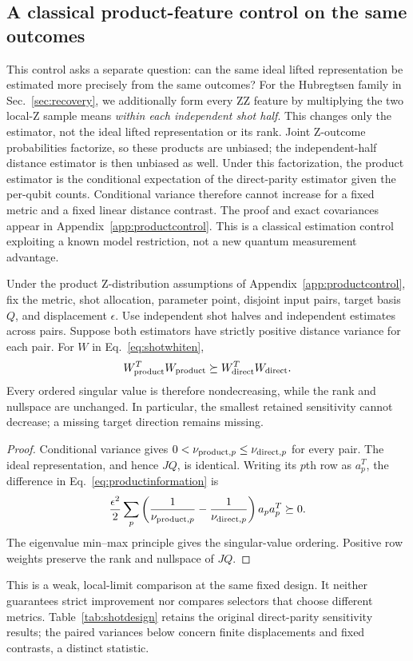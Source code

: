 \subsection{A classical product-feature control on the same outcomes}
\label{sec:productcontrol}
This control asks a separate question: can the same ideal lifted
representation be estimated more precisely from the same outcomes?
For the Hubregtsen family in Sec.~\ref{sec:recovery}, we additionally
form every ZZ feature by multiplying the two local-Z sample means
\emph{within each independent shot half}. This changes only the
estimator, not the ideal lifted representation or its rank. Joint
Z-outcome probabilities factorize, so these products are unbiased;
the independent-half distance estimator is then unbiased as well.
Under this factorization, the product estimator is the conditional
expectation of the direct-parity estimator given the per-qubit
counts. Conditional variance therefore cannot increase for a fixed
metric and a fixed linear distance contrast. The proof and exact
covariances appear in Appendix~\ref{app:productcontrol}. This is a
classical estimation control exploiting a known model restriction,
not a new quantum measurement advantage.

\begin{corollary}
\label{cor:productsensitivity}
Under the product Z-distribution assumptions of
Appendix~\ref{app:productcontrol}, fix the metric, shot allocation,
parameter point, disjoint input pairs, target basis $Q$, and
displacement $\epsilon$. Use independent shot halves and independent
estimates across pairs. Suppose both estimators have strictly positive
distance variance for each pair. For $W$ in Eq.~\eqref{eq:shotwhiten},
\begin{equation}
 W_{\rm product}^T W_{\rm product}
 \succeq W_{\rm direct}^T W_{\rm direct}.
 \label{eq:productinformation}
\end{equation}
Every ordered singular value is therefore nondecreasing, while the
rank and nullspace are unchanged. In particular, the smallest retained
sensitivity cannot decrease; a missing target direction remains missing.
\end{corollary}
\begin{proof}
Conditional variance gives
$0<\nu_{{\rm product},p}\le\nu_{{\rm direct},p}$ for every pair.
The ideal representation, and hence $JQ$, is identical. Writing its
$p$th row as $a_p^T$, the difference in Eq.~\eqref{eq:productinformation}
is
\begin{equation}
 \frac{\epsilon^2}{2}\sum_p
 \left(\frac{1}{\nu_{{\rm product},p}}-
       \frac{1}{\nu_{{\rm direct},p}}\right)a_pa_p^T\succeq0.
\end{equation}
The eigenvalue min--max principle gives the singular-value ordering.
Positive row weights preserve the rank and nullspace of $JQ$.
\end{proof}
This is a weak, local-limit comparison at the same fixed design.
It neither guarantees strict improvement nor compares selectors that
choose different metrics. Table~\ref{tab:shotdesign} retains the
original direct-parity sensitivity results; the paired variances below
concern finite displacements and fixed contrasts, a distinct statistic.

